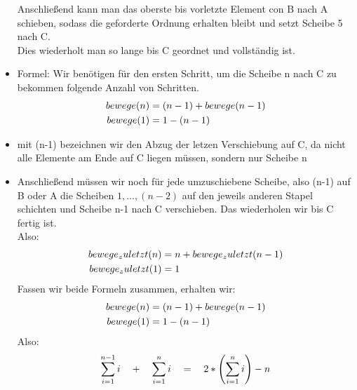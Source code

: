 \begin{itemize}{a)}
			Anschließend kann man das oberste bis vorletzte Element con B nach A schieben, sodass die geforderte Ordnung erhalten bleibt und setzt Scheibe 5 nach C. \\
			Dies wiederholt man so lange bis C geordnet und vollständig ist. 
			\item Formel: 
				Wir benötigen für den ersten Schritt, um die Scheibe n nach C zu bekommen folgende Anzahl von Schritten. \\
			 	\begin{equation}
			 		\begin{aligned}
			 			bewege(n) &= (n-1)+ bewege(n-1) \\
			 			bewege(1) &= 1 - (n-1) \quad \notag \\			 			
			 		\end{aligned}
			 	\end{equation}
			 	\item mit (n-1) bezeichnen wir den Abzug der letzen Verschiebung auf C, da nicht alle Elemente am Ende auf C liegen müssen, sondern nur Scheibe n \\
			 	\item Anschließend müssen wir noch für jede umzuschiebene Scheibe, also (n-1) auf B oder A die Scheiben $1, \dots ,(n-2)$ auf den jeweils anderen Stapel schichten und Scheibe n-1 nach C verschieben. Das wiederholen wir bis C fertig ist. \\
			 	Also: \\
			 	\begin{equation}
			 		\begin{aligned}
			 			bewege_zuletzt(n) &= n + bewege_zuletzt(n-1)\\
			 			bewege_zuletzt(1)& = 1 \notag\\ 
 			 		\end{aligned}
			 	\end{equation}
			 	Fassen wir beide Formeln zusammen, erhalten wir: 
			 	\begin{equation}
			 		\begin{aligned}
			 			bewege(n) &= (n-1) + bewege(n-1) \\
			 			bewege(1) &= 1 - (n-1) \notag\\ 
			 		\end{aligned}
			 	\end{equation}
			 	Also: 
			 	\begin{equation}
			 		\begin{aligned}
			 			\displaystyle \sum_{i=1}^{n-1}{i} \quad + \quad \displaystyle\sum_{i=1}^{n}{i}\quad = \quad 2* \left(\displaystyle\sum_{i=1}^{n}{i}\right) - n \notag\\

\end{aligned}
\end{equation}
\end{itemize}
